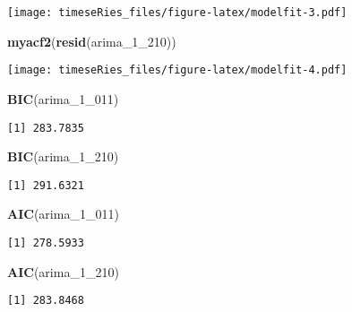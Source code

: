 \documentclass[]{book}
\newenvironment{Shaded}{\begin{snugshade}}{\end{snugshade}}
\newcommand{\DecValTok}[1]{\textcolor[rgb]{0.00,0.00,0.81}{#1}}
\newcommand{\KeywordTok}[1]{\textcolor[rgb]{0.13,0.29,0.53}{\textbf{#1}}}
\newcommand{\NormalTok}[1]{#1}
\begin{document}
\texttt{[image: timeseRies\_files/figure-latex/modelfit-3.pdf]}

\begin{Shaded}
\begin{Highlighting}[]
\KeywordTok{myacf2}\NormalTok{(}\KeywordTok{resid}\NormalTok{(arima_}\DecValTok{1}\NormalTok{_}\DecValTok{210}\NormalTok{))}
\end{Highlighting}
\end{Shaded}

\texttt{[image: timeseRies\_files/figure-latex/modelfit-4.pdf]}

\begin{Shaded}
\begin{Highlighting}[]
\KeywordTok{BIC}\NormalTok{(arima_}\DecValTok{1}\NormalTok{_}\DecValTok{011}\NormalTok{)}
\end{Highlighting}
\end{Shaded}

\begin{verbatim}
[1] 283.7835
\end{verbatim}

\begin{Shaded}
\begin{Highlighting}[]
\KeywordTok{BIC}\NormalTok{(arima_}\DecValTok{1}\NormalTok{_}\DecValTok{210}\NormalTok{)}
\end{Highlighting}
\end{Shaded}

\begin{verbatim}
[1] 291.6321
\end{verbatim}

\begin{Shaded}
\begin{Highlighting}[]
\KeywordTok{AIC}\NormalTok{(arima_}\DecValTok{1}\NormalTok{_}\DecValTok{011}\NormalTok{)}
\end{Highlighting}
\end{Shaded}

\begin{verbatim}
[1] 278.5933
\end{verbatim}

\begin{Shaded}
\begin{Highlighting}[]
\KeywordTok{AIC}\NormalTok{(arima_}\DecValTok{1}\NormalTok{_}\DecValTok{210}\NormalTok{)}
\end{Highlighting}
\end{Shaded}

\begin{verbatim}
[1] 283.8468
\end{verbatim}
\end{document}
